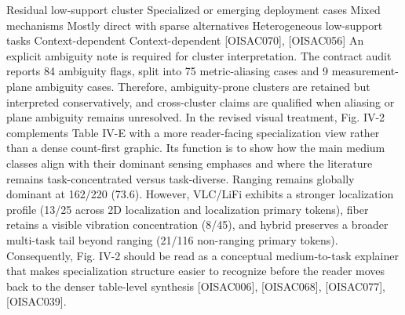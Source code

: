 {}\markdownRendererPipe{} Residual low-support cluster \markdownRendererPipe{} Specialized or emerging deployment cases \markdownRendererPipe{} Mixed mechanisms \markdownRendererPipe{} Mostly direct with sparse alternatives \markdownRendererPipe{} Heterogeneous low-support tasks \markdownRendererPipe{} Context-dependent \markdownRendererPipe{} Context-dependent \markdownRendererPipe{} [O\markdownRendererUnderscore{}ISAC\markdownRendererUnderscore{}070], [O\markdownRendererUnderscore{}ISAC\markdownRendererUnderscore{}056] \markdownRendererPipe{}\markdownRendererParagraphSeparator
{}An explicit ambiguity note is required for cluster interpretation. The contract audit reports 84 ambiguity flags, split into 75 metric-aliasing cases and 9 measurement-plane ambiguity cases. Therefore, ambiguity-prone clusters are retained but interpreted conservatively, and cross-cluster claims are qualified when aliasing or plane ambiguity remains unresolved.\markdownRendererParagraphSeparator
{}In the revised visual treatment, Fig. IV-2 complements Table IV-E with a more reader-facing specialization view rather than a dense count-first graphic. Its function is to show how the main medium classes align with their dominant sensing emphases and where the literature remains task-concentrated versus task-diverse. Ranging remains globally dominant at 162/220 (73.6\markdownRendererPercentSign{}). However, VLC/LiFi exhibits a stronger localization profile (13/25 across 2D localization and localization primary tokens), fiber retains a visible vibration concentration (8/45), and hybrid preserves a broader multi-task tail beyond ranging (21/116 non-ranging primary tokens). Consequently, Fig. IV-2 should be read as a conceptual medium-to-task explainer that makes specialization structure easier to recognize before the reader moves back to the denser table-level synthesis [O\markdownRendererUnderscore{}ISAC\markdownRendererUnderscore{}006], [O\markdownRendererUnderscore{}ISAC\markdownRendererUnderscore{}068], [O\markdownRendererUnderscore{}ISAC\markdownRendererUnderscore{}077], [O\markdownRendererUnderscore{}ISAC\markdownRendererUnderscore{}039].\markdownRendererParagraphSeparator
{}\markdownRendererParagraphSeparator
